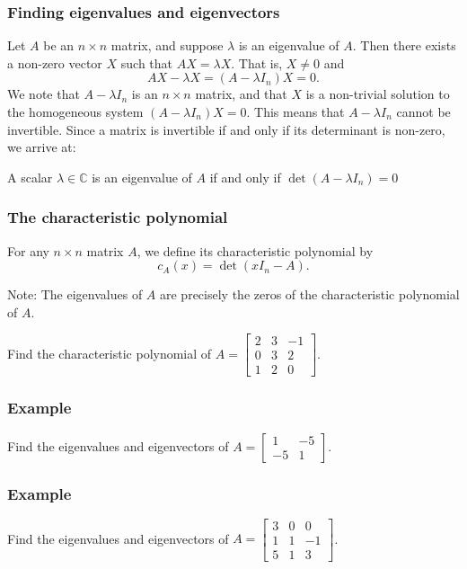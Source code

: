 \documentclass[11pt,t]{beamer}
\newcommand{\C}{\mathbb{C}}
\begin{document}
\begin{frame}
\frametitle{Finding eigenvalues and eigenvectors}

Let $A$ be an $n\times n$ matrix, and suppose $\lambda$ is an eigenvalue of $A$. Then there exists a \alert{non-zero} vector $X$ such that $AX=\lambda X$. That is, $X\neq 0$ and
\[
AX-\lambda X = (A-\lambda I_n)X = 0.
\]
We note that $A-\lambda I_n$ is an $n\times n$ matrix, and that $X$ is a \alert{non-trivial} solution to the homogeneous system $(A-\lambda I_n)X = 0$. This means that \alert{$A-\lambda I_n$ cannot be invertible}. Since a matrix is invertible if and only if its determinant is non-zero, we arrive at:
\begin{theorem}
A scalar $\lambda\in\C$ is an eigenvalue of $A$ if and only if $\det(A-\lambda I_n)=0$
\end{theorem}

\medskip

\end{frame}
\begin{frame}
\frametitle{The characteristic polynomial}
\begin{definition}
For any $n\times n$ matrix $A$, we define its \alert{characteristic polynomial} by
\[
c_A(x) = \det(xI_n-A).
\]
\end{definition}
\alert{Note:} The eigenvalues of $A$ are precisely the zeros of the characteristic polynomial of $A$.
\begin{example}
Find the characteristic polynomial of $A = \begin{bmatrix}
2&3&-1\\0&3&2\\1&2&0
\end{bmatrix}$.
\end{example}
\end{frame}
\begin{frame}
\frametitle{Example}
Find the eigenvalues and eigenvectors of $A = \begin{bmatrix}1&-5\\-5&1\end{bmatrix}$.

\end{frame}
\begin{frame}
\frametitle{Example}
Find the eigenvalues and eigenvectors of $A = \begin{bmatrix}3&0&0\\1&1&-1\\5&1&3\end{bmatrix}$.
\end{frame}
\end{document}
